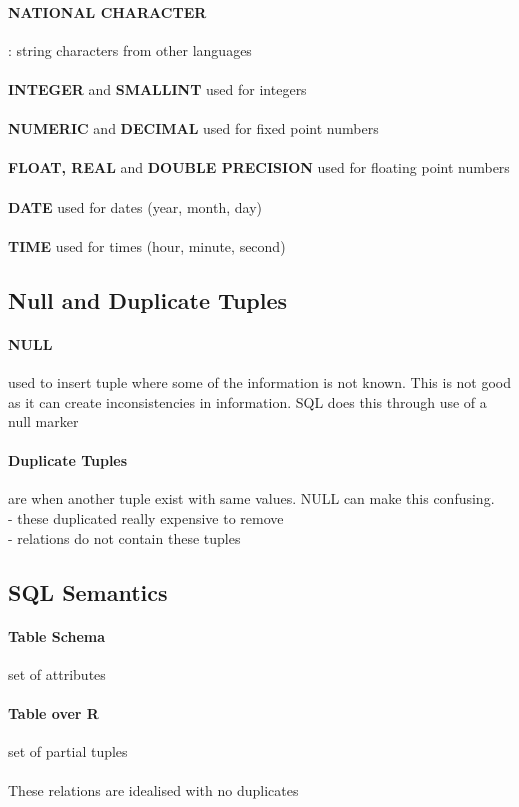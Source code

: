 \documentclass{article}
\newcommand\tab[1][0.5cm]{\hspace*{#1}}
\begin{document}
		\paragraph{NATIONAL CHARACTER}: string characters from other languages
		\\ \\ \textbf{INTEGER} and \textbf{SMALLINT} used for integers
		\\ \\ \textbf{NUMERIC} and \textbf{DECIMAL} used for fixed point numbers
		\\ \\ \textbf{FLOAT, REAL} and \textbf{DOUBLE PRECISION} used for floating point numbers
		\\ \\ \textbf{DATE} used for dates (year, month, day)
		\\ \\ \textbf{TIME} used for times (hour, minute, second)

	\subsection{Null and Duplicate Tuples}
		\paragraph{NULL} used to insert tuple where some of the information is not known. This is not good as it can create inconsistencies in information. SQL does this through use of a null marker

		\paragraph{Duplicate Tuples} are when another tuple exist with same values. NULL can make this confusing.
		\\ \tab - these duplicated really expensive to remove
		\\ \tab - relations do not contain these tuples

	\subsection{SQL Semantics}
		\paragraph{Table Schema} set of attributes
		\paragraph{Table over R} set of partial tuples
		\\ \\ These relations are idealised with no duplicates
\end{document}
